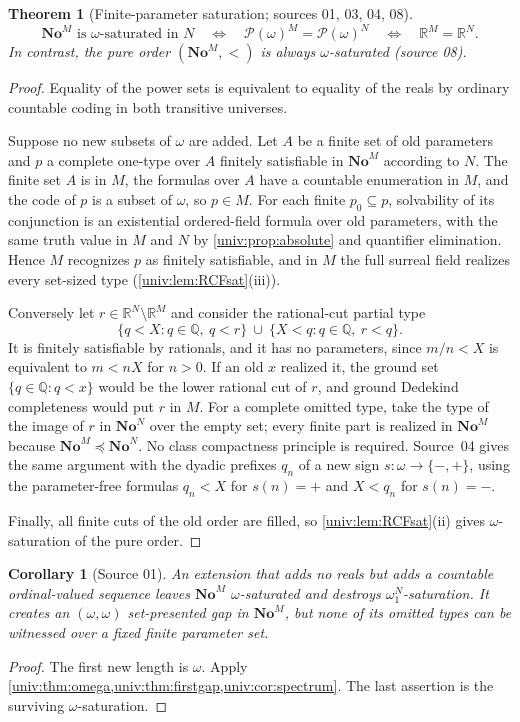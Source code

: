 \documentclass[11pt,letterpaper]{article}
\numberwithin{equation}{section}
\newtheorem{theorem}{Theorem}[section]
\newtheorem{corollary}[corollary]{Corollary}
\theoremstyle{definition}
\theoremstyle{remark}
\newcommand{\No}{\mathbf{No}}
\newcommand{\NoM}{\No^{M}}
\newcommand{\NoN}{\No^{N}}
\newcommand{\R}{\mathbb R}
\newcommand{\Q}{\mathbb Q}
\newcommand{\Pow}{\mathcal P}
\begin{document}
\begin{theorem}[Finite-parameter saturation; sources 01, 03, 04, 08]\label{univ:thm:omega}
\[
 \NoM\text{ is }\omega\text{-saturated in }N
 \quad\Longleftrightarrow\quad
 \Pow(\omega)^M=\Pow(\omega)^N
 \quad\Longleftrightarrow\quad
 \R^M=\R^N.
\]
In contrast, the pure order $(\NoM,<)$ is always $\omega$-saturated
\textup{(source 08)}.
\end{theorem}
\begin{proof}
Equality of the power sets is equivalent to equality of the reals by ordinary
countable coding in both transitive universes.

Suppose no new subsets of $\omega$ are added. Let $A$ be a finite set of old
parameters and $p$ a complete one-type over $A$ finitely satisfiable in
$\NoM$ according to $N$. The finite set $A$ is in $M$, the formulas over $A$
have a countable enumeration in $M$, and the code of $p$ is a subset of
$\omega$, so $p\in M$. For each finite $p_0\subseteq p$, solvability of its
conjunction is an existential ordered-field formula over old parameters, with
the same truth value in $M$ and $N$ by \cref{univ:prop:absolute} and quantifier
elimination. Hence $M$ recognizes $p$ as finitely satisfiable, and in $M$ the
full surreal field realizes every set-sized type (\cref{univ:lem:RCFsat}(iii)).

Conversely let $r\in\R^N\setminus\R^M$ and consider the rational-cut partial
type
\begin{equation}\label{univ:eq:newrealtype}
 \{q<X:q\in\Q,\ q<r\}
 \ \cup\
 \{X<q:q\in\Q,\ r<q\}.
\end{equation}
It is finitely satisfiable by rationals, and it has no parameters, since
$m/n<X$ is equivalent to $m<nX$ for $n>0$. If an old $x$ realized it, the
ground set $\{q\in\Q:q<x\}$ would be the lower rational cut of $r$, and ground
Dedekind completeness would put $r$ in $M$. For a complete omitted type, take
the type of the image of $r$ in $\NoN$ over the empty set; every finite part is
realized in $\NoM$ because $\NoM\preccurlyeq\NoN$. No class compactness
principle is required. Source~04 gives the same argument with the dyadic
prefixes $q_n$ of a new sign $s:\omega\to\{-,+\}$, using the parameter-free
formulas $q_n<X$ for $s(n)=+$ and $X<q_n$ for $s(n)=-$.

Finally, all finite cuts of the old order are filled, so
\cref{univ:lem:RCFsat}(ii) gives $\omega$-saturation of the pure order.
\end{proof}

\begin{corollary}[Source 01]\label{univ:cor:omegaone}
An extension that adds no reals but adds a countable ordinal-valued sequence
leaves $\NoM$ $\omega$-saturated and destroys $\omega_1^N$-saturation. It
creates an $(\omega,\omega)$ set-presented gap in $\NoM$, but none of its
omitted types can be witnessed over a fixed finite parameter set.
\end{corollary}
\begin{proof}
The first new length is $\omega$. Apply
\cref{univ:thm:omega,univ:thm:firstgap,univ:cor:spectrum}. The last assertion
is the surviving $\omega$-saturation.
\end{proof}
\end{document}
